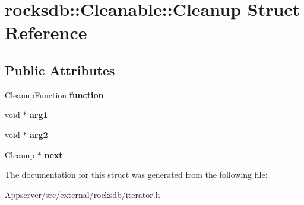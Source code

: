 \hypertarget{structrocksdb_1_1Cleanable_1_1Cleanup}{}\section{rocksdb\+:\+:Cleanable\+:\+:Cleanup Struct Reference}
\label{structrocksdb_1_1Cleanable_1_1Cleanup}
\subsection*{Public Attributes}
\begin{DoxyCompactItemize}
\item 
Cleanup\+Function {\bfseries function}\hypertarget{structrocksdb_1_1Cleanable_1_1Cleanup_a3dd70245f1a3adb8c71c2fe05aafcd0e}{}\label{structrocksdb_1_1Cleanable_1_1Cleanup_a3dd70245f1a3adb8c71c2fe05aafcd0e}

\item 
void $\ast$ {\bfseries arg1}\hypertarget{structrocksdb_1_1Cleanable_1_1Cleanup_a2aa0ab56c7c4f9fd3c56e8d28dfae94e}{}\label{structrocksdb_1_1Cleanable_1_1Cleanup_a2aa0ab56c7c4f9fd3c56e8d28dfae94e}

\item 
void $\ast$ {\bfseries arg2}\hypertarget{structrocksdb_1_1Cleanable_1_1Cleanup_a663dba13cc20c0544a2cc7e192c8de8d}{}\label{structrocksdb_1_1Cleanable_1_1Cleanup_a663dba13cc20c0544a2cc7e192c8de8d}

\item 
\hyperlink{structrocksdb_1_1Cleanable_1_1Cleanup}{Cleanup} $\ast$ {\bfseries next}\hypertarget{structrocksdb_1_1Cleanable_1_1Cleanup_a7abe56c85a97991623913e96336939aa}{}\label{structrocksdb_1_1Cleanable_1_1Cleanup_a7abe56c85a97991623913e96336939aa}

\end{DoxyCompactItemize}


The documentation for this struct was generated from the following file\+:\begin{DoxyCompactItemize}
\item 
Appserver/src/external/rocksdb/iterator.\+h\end{DoxyCompactItemize}
